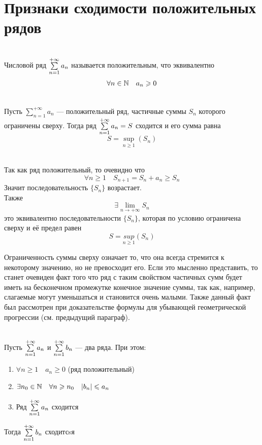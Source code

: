 \section{Признаки сходимости положительных рядов}

\begin{Def}~\\
	Числовой ряд $\sum\limits_{n = 1}^{+\infty}{a_n}$ называется положительным, что эквивалентно
    \[
         \forall n \in \mathbb{N} \quad a_n \geqslant 0
    \]
\end{Def}

\begin{Th}~\\
	Пусть $\sum\limits_{n = 1}^{+\infty}a_n$ --- положительный ряд, частичные суммы $S_n$ которого ограничены сверху. Тогда ряд $\sum\limits_{n = 1}^{+\infty}{a_n} = S$ сходится и его сумма равна 
    \[
        S = \underset{n \geqslant 1}{\sup}(S_n)
    \]
\end{Th}

\begin{Proof}~\\
    Так как ряд положительный, то очевидно что
    \[
        \forall n \geqslant 1 \quad S_{n+1} = S_n + a_n \geqslant S_n
    \]
    Значит последовательность $\{S_n\}$ возрастает.\\
    Также
    \[
        \exists \lim_{n \to +\infty}S_n
    \]
    это эквивалентно последовательности $\{S_n\}$, которая по условию ограничена сверху и её предел равен 
    \[
        S = \underset{n \geq 1}{sup}(S_n)
    \]
\end{Proof}

Ограниченность суммы сверху означает то, что она всегда стремится к некоторому значению, но не превосходит его. Если это мысленно представить, то станет очевиден факт того что ряд с таким свойством частичных сумм будет иметь на бесконечном промежутке конечное значение суммы, так как, например, слагаемые могут уменьшаться и становится очень малыми. Также данный факт был рассмотрен при доказательстве формулы для убывающей геометрической прогрессии (см. предыдущий параграф).


\pagebreak

\begin{Th}~\\
	Пусть $\sum\limits_{n = 1}^{+\infty}{a_n}$ и $\sum\limits_{n = 1}^{+\infty}{b_n}$ --- два ряда. При этом:
	\begin{enumerate}
		\item $\forall n \geq 1 \quad a_n \geq 0$ (ряд положительный)
        
		\item $\exists n_0 \in \mathbb{N} \quad \forall n \geqslant n_0 \quad |b_n| \leqslant a_n$
        
		\item Ряд $\sum\limits_{n = 1}^{+\infty}{a_n}$ сходится
	\end{enumerate}
	Тогда $\sum\limits_{n = 1}^{+\infty}{b_n}$ сходитсsя
\end{Th}


